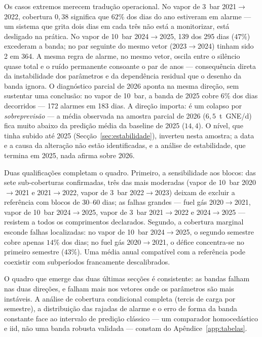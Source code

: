 Os casos extremos merecem tradução operacional. No vapor de 3~bar
2021${\to}$2022, cobertura $0{,}38$ significa que $62\%$ dos dias do ano
estiveram em alarme --- um sistema que grita dois dias em cada três não está a
monitorizar, está desligado na prática. No vapor de 10~bar 2024${\to}$2025,
139 dos 295 dias ($47\%$) excederam a banda; no par seguinte do mesmo vetor
(2023${\to}$2024) tinham sido 2 em 364. A mesma regra de alarme, no mesmo
vetor, oscila entre o silêncio quase total e o ruído permanente consoante o
par de anos --- consequência direta da instabilidade dos parâmetros e da
dependência residual que o desenho da banda ignora. O diagnóstico parcial de
2026 aponta na mesma direção, sem sustentar uma conclusão: no vapor de 10~bar,
a banda de 2025 cobre $6\%$ dos dias decorridos --- 172 alarmes em 183 dias.
A direção importa: é um colapso por \emph{sobreprevisão} --- a média
observada na amostra parcial de 2026 ($6{,}5$~t~GNE/d) fica muito abaixo da
predição média da baseline de 2025 ($14{,}4$). O nível, que tinha subido até
2025 (Secção~\ref{sec:estabilidade}), inverteu nesta amostra; a data e a
causa da alteração não estão identificadas, e a análise de estabilidade,
que termina em 2025, nada afirma sobre 2026.

Duas qualificações completam o quadro. Primeiro, a sensibilidade aos blocos:
das sete sub-coberturas confirmadas, três das mais moderadas (vapor de 10~bar
2020${\to}$2021 e 2021${\to}$2022, vapor de 3~bar 2022${\to}$2023) deixam de
excluir a referência com blocos de 30--60 dias; as falhas grandes ---
fuel gás 2020${\to}$2021, vapor de 10~bar 2024${\to}$2025, vapor de 3~bar
2021${\to}$2022 e 2024${\to}$2025 --- resistem a todos os comprimentos
declarados. Segundo, a cobertura marginal esconde falhas localizadas: no
vapor de 10~bar 2024${\to}$2025, o segundo semestre cobre apenas $14\%$ dos
dias; no fuel gás 2020${\to}$2021, o défice concentra-se no primeiro semestre
($43\%$). Uma média anual compatível com a referência pode coexistir com
subperíodos francamente descalibrados.

O quadro que emerge das duas últimas secções é consistente: as bandas falham
nas duas direções, e falham mais nos vetores onde os parâmetros são mais
instáveis. A análise de cobertura condicional completa (tercis de carga por
semestre), a distribuição das rajadas de alarme e o erro de forma da banda
constante face ao intervalo de predição clássico --- um comparador
homocedástico e iid, não uma banda robusta validada --- constam do
Apêndice~\ref{app:tabelas}.

